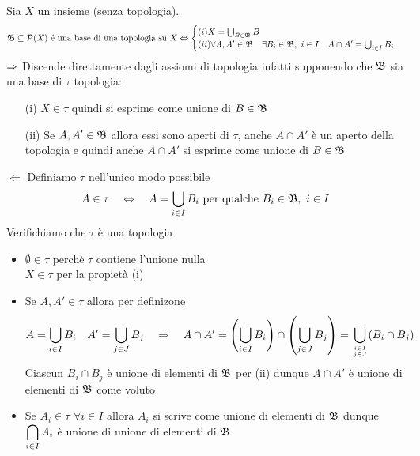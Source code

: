 \begin{prop}\bianco
 Sia $X$ un insieme (senza topologia).
 $$ \mathfrak{B} \subseteq \mathcal{P}(X) \text{ \'e una base di una topologia su } X  \Leftrightarrow  \begin{cases} 
                                                                                              (i) X =\bigcup_{B \in \mathfrak{B}} B \\ 
                                                                                              (ii) \forall A, A' \in \mathfrak{B} \quad \exists B_i \in \mathfrak{B} , \, \, i \in I \quad A\cap A' =\bigcup_{i\in I } B_i 
                                                                                             \end{cases}$$
\proof $\Rightarrow$ Discende direttamente dagli assiomi di topologia infatti supponendo che $\mathfrak{B}$ sia una base di $\tau$ topologia: 
\begin{itemize}
 \item[(i)] $X\in \tau $ quindi si esprime come unione di $B \in \mathfrak{B}$ 
 \item[(ii)] Se $A,A'\in \mathfrak{B} $ allora essi sono aperti di $\tau$, anche $A\cap A'$ \`e un aperto della topologia e quindi anche $A\cap A'$ si esprime come unione di $B\in\mathfrak{B}$
\end{itemize}
$\Leftarrow$ Definiamo $\tau$ nell'unico modo possibile
$$ A\in \tau \quad \Leftrightarrow \quad A = \bigcup_{i \in I} B_i \text{ per qualche } B_i \in \mathfrak{B} , \, \, i\in I $$ 
Verifichiamo che $\tau$ \`e una topologia
\begin{itemize}
 \item $\emptyset \in \tau$ perch\`e $\tau$ contiene l'unione nulla\\
 $ X\in \tau $ per la propiet\`a (i)
 \item Se $A,A' \in \tau $ allora per definizone 
 $$ A= \bigcup_{i \in I } B_i \quad A'=\bigcup_{j \in J} B_j  \quad \Rightarrow \quad A\cap A'= \left( \bigcup_{i\in I } B_i \right)  \cap \left( \bigcup_{j\in J } B_j \right)= \bigcup_{i\in I \atop{ j \in J }} (B_i \cap B_j )$$
 Ciascun $B_i \cap B_j$ \`e unione di elementi di $\mathfrak{B}$ per (ii) dunque $A\cap A'$ \`e unione di elementi di $\mathfrak{B}$ come voluto
 \item Se $A_i\in \tau \, \, \forall i \in I $ allora $A_i $ si scrive come unione di elementi di $\mathfrak{B}$ dunque $\displaystyle \bigcap_{i\in I} A_i$ \`e unione di unione di elementi di $\mathfrak{B}$
 \end{itemize}

\endproof

\end{prop}
